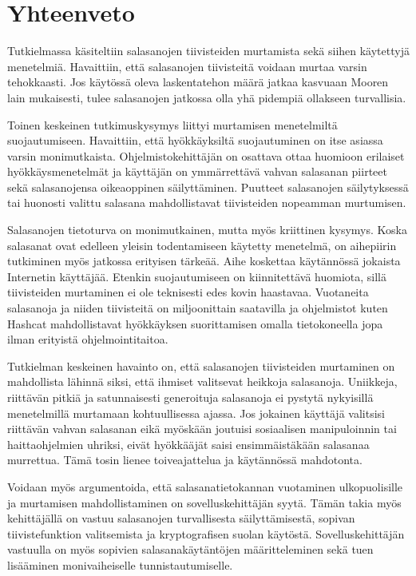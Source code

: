\chapter{Yhteenveto\label{ch:yhteenveto}}

Tutkielmassa käsiteltiin salasanojen tiivisteiden murtamista sekä siihen käytettyjä menetelmiä. Havaittiin, että salasanojen tiivisteitä voidaan murtaa varsin tehokkaasti. Jos käytössä oleva laskentatehon määrä jatkaa kasvuaan Mooren lain mukaisesti, tulee salasanojen jatkossa olla yhä pidempiä ollakseen turvallisia.

Toinen keskeinen tutkimuskysymys liittyi murtamisen menetelmiltä suojautumiseen. Havaittiin, että hyökkäyksiltä suojautuminen on itse asiassa varsin monimutkaista. Ohjelmistokehittäjän on osattava ottaa huomioon erilaiset hyökkäysmenetelmät ja käyttäjän on ymmärrettävä vahvan salasanan piirteet sekä salasanojensa oikeaoppinen säilyttäminen. Puutteet salasanojen säilytyksessä tai huonosti valittu salasana mahdollistavat tiivisteiden nopeamman murtumisen.

Salasanojen tietoturva on monimutkainen, mutta myös kriittinen kysymys. Koska salasanat ovat edelleen yleisin todentamiseen käytetty menetelmä, on aihepiirin tutkiminen myös jatkossa erityisen tärkeää. Aihe koskettaa käytännössä jokaista Internetin käyttäjää. Etenkin suojautumiseen on kiinnitettävä huomiota, sillä tiivisteiden murtaminen ei ole teknisesti edes kovin haastavaa. Vuotaneita salasanoja ja niiden tiivisteitä on miljoonittain saatavilla ja ohjelmistot kuten Hashcat mahdollistavat hyökkäyksen suorittamisen omalla tietokoneella jopa ilman erityistä ohjelmointitaitoa.

Tutkielman keskeinen havainto on, että salasanojen tiivisteiden murtaminen on mahdollista lähinnä siksi, että ihmiset valitsevat heikkoja salasanoja. Uniikkeja, riittävän pitkiä ja satunnaisesti generoituja salasanoja ei pystytä nykyisillä menetelmillä murtamaan kohtuullisessa ajassa. Jos jokainen käyttäjä valitsisi riittävän vahvan salasanan eikä myöskään joutuisi sosiaalisen manipuloinnin tai haittaohjelmien uhriksi, eivät hyökkääjät saisi ensimmäistäkään salasanaa murrettua. Tämä tosin lienee toiveajattelua ja käytännössä mahdotonta.

Voidaan myös argumentoida, että salasanatietokannan vuotaminen ulkopuolisille ja murtamisen mahdollistaminen on sovelluskehittäjän syytä. Tämän takia myös kehittäjällä on vastuu salasanojen turvallisesta säilyttämisestä, sopivan tiivistefunktion valitsemista ja kryptografisen suolan käytöstä. Sovelluskehittäjän vastuulla on myös sopivien salasanakäytäntöjen määritteleminen sekä tuen lisääminen monivaiheiselle tunnistautumiselle.

